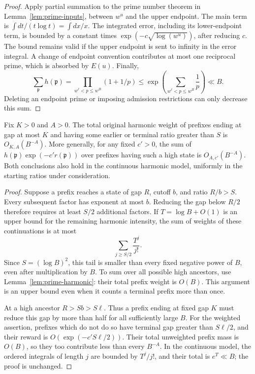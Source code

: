 \begin{proof}
Apply partial summation to the prime number theorem in
Lemma~\ref{lem:prime-inputs}, between $w^u$ and the upper endpoint.
The main term is $\int dt/(t\log t)=\int dx/x$.  The integrated error,
including its lower-endpoint term, is bounded by a constant times
$\exp(-c\sqrt{\log(w^u)})$, after reducing $c$.  The bound remains valid
if the upper endpoint is sent to infinity in the error integral.  A
change of endpoint convention contributes at most one reciprocal prime,
which is absorbed by $E(u)$.  Finally,
\[
 \sum_{\mathfrak p}h(\mathfrak p)
   =\prod_{w^\ell<p\leq w^B}(1+1/p)
   \leq\exp\left(\sum_{w^\ell<p\leq w^B}\frac1p\right)\ll B.
\]
Deleting an endpoint prime or imposing admission restrictions can only
decrease this sum.
\end{proof}

\begin{lemma}\label{lem:high-states}
Fix $K>0$ and $A>0$.  The total original harmonic weight of prefixes
ending at gap at most $K$ and having some earlier or terminal ratio
greater than $S$ is $O_{K,A}(B^{-A})$.  More generally, for any fixed
$c'>0$, the sum of
$h(\mathfrak p)\exp(-c'r(\mathfrak p))$ over prefixes having such a
high state is $O_{A,c'}(B^{-A})$.  Both conclusions also hold in the
continuous harmonic model, uniformly in the starting ratios under
consideration.
\end{lemma}

\begin{proof}
Suppose a prefix reaches a state of gap $R$, cutoff $b$, and ratio
$R/b>S$.  Every subsequent factor has exponent at most $b$.  Reducing
the gap below $R/2$ therefore requires at least $S/2$ additional factors.
If $T=\log B+O(1)$ is an upper bound for the remaining harmonic
intensity, the sum of weights of these continuations is at most
\[
 \sum_{j\geq S/2}\frac{T^j}{j!}.
\]
Since $S=(\log B)^2$, this tail is smaller than every fixed negative
power of $B$, even after multiplication by $B$.  To sum over all
possible high ancestors, use Lemma~\ref{lem:prime-harmonic}: their
total prefix weight is $O(B)$.  This argument is an upper bound even
when it counts a terminal prefix more than once.

At a high ancestor $R>Sb>S\ell$.  Thus a prefix ending at fixed gap
$K$ must reduce this gap by more than half for all sufficiently large
$B$.  For the weighted assertion, prefixes which do not do so have
terminal gap greater than $S\ell/2$, and their reward is
$O(\exp(-c'S\ell/2))$.  Their total unweighted prefix mass is $O(B)$,
so they too contribute less than every $B^{-A}$.  In the continuous
model, the ordered integrals of length $j$ are bounded by $T^j/j!$,
and their total is $e^T\ll B$; the proof is unchanged.
\end{proof}

